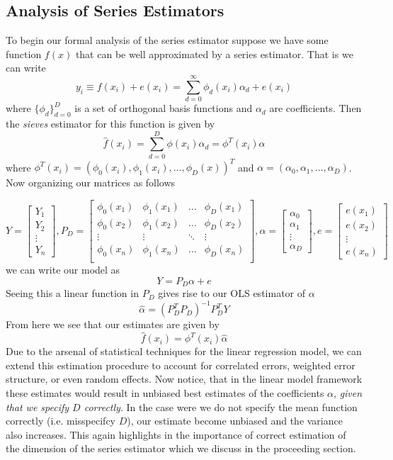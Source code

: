 \documentclass[12pt]{article}  %
\begin{document}
\subsection{Analysis of Series Estimators}

To begin our formal analysis of the series estimator suppose we have some function $f(x)$ that can be well approximated by a series estimator. That is we can write $$y_i\equiv f(x_i) + e(x_i)= \sum_{d=0}^{\infty}\phi_{d}(x_i)\alpha_d + e(x_i)$$
where $\{\phi_d\}_{d=0}^{D}$ is a set of orthogonal basis functions and $\alpha_d$ are coefficients. Then the \textit{sieves} estimator for this function is given by $$\hat{f}(x_i) = \sum_{d=0}^{D}\phi(x_i)\alpha_{d} = \phi^{T}(x_i)\alpha$$where $\phi^{T}(x_i) = (\phi_{0}(x_i), \phi_{1}(x_i),\ldots, \phi_D(x))^{T}$ and $\alpha = (\alpha_0, \alpha_1, \ldots, \alpha_D)$. Now organizing our matrices as follows 

$$Y = \begin{bmatrix}Y_1\\ Y_2\\\vdots\\Y_n\end{bmatrix}, P_D = \begin{bmatrix}\phi_0(x_1) & \phi_1(x_1) & \ldots & \phi_{D}(x_1)\\\phi_0(x_2) & \phi_1(x_2) & \ldots & \phi_{D}(x_2)\\\vdots & \vdots & \ddots & \vdots \\\phi_0(x_n) & \phi_1(x_n) & \ldots & \phi_{D}(x_n)\\\end{bmatrix}, \alpha = \begin{bmatrix}\alpha_0\\\alpha_1 \\\vdots\\\alpha_D\end{bmatrix}, e =\begin{bmatrix}e(x_1)\\e(x_2)\\\vdots\\e(x_n)\end{bmatrix}$$ we can write our model as $$Y = P_D\alpha + e$$
Seeing this a linear function in $P_D$ gives rise to our OLS estimator of $\alpha$ $$\hat{\alpha} = (P_D^{T}P_D)^{-1}P_D^{T}Y$$ From here we see that our estimates are given by $$\hat{f}(x_i) = \phi^{T}(x_i)\hat{\alpha}$$
Due to the arsenal of statistical techniques for the linear regression model, we can extend this estimation procedure to account for correlated errors, weighted error structure, or even random effects. Now notice, that in the linear model framework these estimates would result in unbiased best estimates of the coefficients $\alpha$, \textit{given that we specify $D$ correctly}. In the case were we do not specify the mean function correctly (i.e. misspecifcy $D$), our estimate become unbiased and the variance also increases. This again highlights in the importance of correct estimation of the dimension of the series estimator which we discuss in the proceeding section. 
\end{document}
